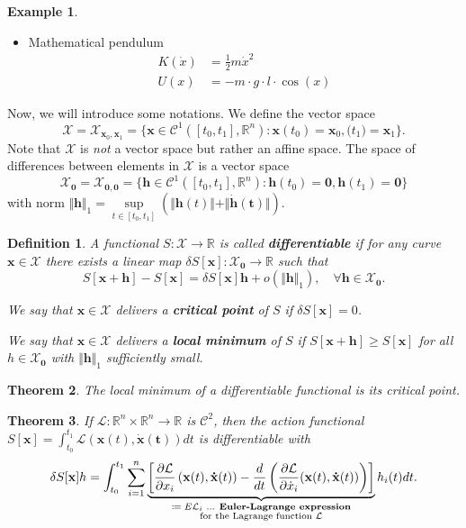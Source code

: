 \documentclass[hidelinks,a4paper, 11pt]{article}
\theoremstyle{plain}
\newtheorem{theorem}{Theorem}
\theoremstyle{break}
\theoremstyle{plain}
\newtheorem{definition}[theorem]{Definition}
\theoremstyle{definition}
\newtheorem*{example}{Example}
\begin{document}
{\begin{example}
\begin{itemize}
		\item Mathematical pendulum
		\begin{align*}
			K(\dot x) &= \frac{1}{2}m\dot x^2 \\
			U(x) &= -m\cdot g\cdot l\cdot \cos(x)
		\end{align*}
	\end{itemize}
\end{example}

Now, we will introduce some notations. We define the vector space $$\mathcal X = \mathcal X_{\mathbf x_0, \mathbf x_1} = \{ \mathbf x \in \mathcal C^1([t_0,t_1], \mathbb R^n) : \mathbf x(t_0) = \mathbf x_0, \mathbf(t_1) = \mathbf x_1 \}.$$
Note that $\mathcal X$ is \emph{not} a vector space but rather an affine space. The space of differences between elements in $\mathcal X$ is a vector space
\[
	\mathcal X_{\mathbf 0} = \mathcal X_{\mathbf 0, \mathbf 0}  = \{ \mathbf h \in \mathcal C^{1}([t_0,t_1], \mathbb R^n) : \mathbf h(t_0) = \mathbf 0, \mathbf h(t_1) = \mathbf 0 \}
\]
with norm $\Vert \mathbf h \Vert_1 = \sup\limits_{t \in [t_0,t_1]} (\Vert \mathbf h(t) \Vert + \Vert \mathbf{\dot h (t)} \Vert).$

\begin{definition}
	A functional $S: \mathcal X \to \mathbb R$ is called \textbf{differentiable} if for any curve $\mathbf x \in \mathcal X$ there exists a linear map $\delta S[\mathbf x] : \mathcal X_{\mathbf 0} \to \mathbb R$ such that
	\[
		S[\mathbf x + \mathbf h] - S[\mathbf x] = \delta S[\mathbf x]\mathbf h + o(\Vert \mathbf h \Vert_1), \quad \forall \mathbf h \in \mathcal X_{\mathbf 0}.
	\]
	
	We say that $\mathbf x \in \mathcal X$ delivers a \textbf{critical point} of $S$ if $\delta S[\mathbf x] = 0$. 
	
	We say that $\mathbf x \in \mathcal X$ delivers a \textbf{local minimum} of $S$ if $S[\mathbf x + \mathbf h] \geq S [\mathbf x]$ for all $h \in \mathcal X_{\mathbf 0}$ with $\Vert \mathbf h \Vert_1$ sufficiently small.
\end{definition}

\begin{theorem}
	The local minimum of a differentiable functional is its critical point.
\end{theorem}

\begin{theorem}
	If $\mathcal L: \mathbb R^n \times \mathbb R^n \to \mathbb R$ is $\mathcal C^2$, then the action functional $S[\mathbf x] = \int^{t_1}_{t_0} \mathcal L(\mathbf x(t), \mathbf{\dot x(t)}) dt$ is differentiable with
	\[
		\delta S[\mathbf x] h = \int^{t_1}_{t_0} \sum^n_{i=1} \underbrace{\left[
			\frac{\partial \mathcal L}{\partial x_i}\left(\mathbf x(t), \mathbf{\dot x}(t)\right) - \frac{d}{dt}\left( \frac{\partial \mathcal L}{\partial \dot x_i}(\mathbf x(t), \mathbf{\dot x}(t)) \right)
		\right]}_{\substack{\text{$\coloneqq E\mathcal L_i$ ... \textbf{Euler-Lagrange expression}} \\ \text{for the Lagrange function $\mathcal L$}}} h_i(t)dt.
	\]
\end{theorem}

}
\end{document}
